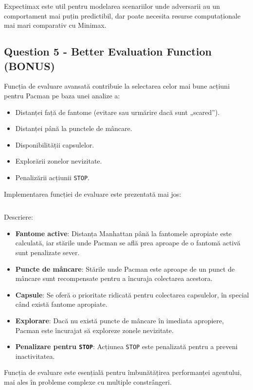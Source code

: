 \par Expectimax este util pentru modelarea scenariilor unde adversarii au un comportament mai puțin predictibil, dar poate necesita resurse computaționale mai mari comparativ cu Minimax.

\subsection{Question 5 - Better Evaluation Function (BONUS)}
\par Funcția de evaluare avansată contribuie la selectarea celor mai bune acțiuni pentru Pacman pe baza unei analize a:
\begin{itemize}
    \item Distanței față de fantome (evitare sau urmărire dacă sunt „scared”).
    \item Distanței până la punctele de mâncare.
    \item Disponibilității capsulelor.
    \item Explorării zonelor nevizitate.
    \item Penalizării acțiunii \texttt{STOP}.
\end{itemize}

\par Implementarea funcției de evaluare este prezentată mai jos:
\inputminted[linenos]{python}{code/better_evaluation_function.py}

\par Descriere:
\begin{itemize}
    \item \textbf{Fantome active}: Distanța Manhattan până la fantomele apropiate este calculată, iar stările unde Pacman se află prea aproape de o fantomă activă sunt penalizate sever.
    \item \textbf{Puncte de mâncare}: Stările unde Pacman este aproape de un punct de mâncare sunt recompensate pentru a încuraja colectarea acestora.
    \item \textbf{Capsule}: Se oferă o prioritate ridicată pentru colectarea capsulelor, în special când există fantome apropiate.
    \item \textbf{Explorare}: Dacă nu există puncte de mâncare în imediata apropiere, Pacman este încurajat să exploreze zonele nevizitate.
    \item \textbf{Penalizare pentru \texttt{STOP}}: Acțiunea \texttt{STOP} este penalizată pentru a preveni inactivitatea.
\end{itemize}

\par Funcția de evaluare este esențială pentru îmbunătățirea performanței agentului, mai ales în probleme complexe cu multiple constrângeri.

